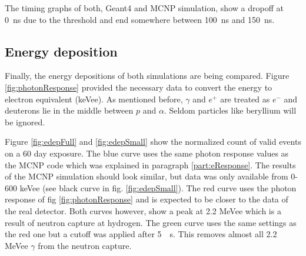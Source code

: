 \documentclass[12pt]{article}
\begin{document}
The timing graphs of both, Geant4 and MCNP simulation, show a dropoff at \SI{0}{ns} due to the threshold and end somewhere between \SI{100}{ns} and \SI{150}{ns}.  

\subsection{Energy deposition}

Finally, the energy depositions of both simulations are being compared. Figure \ref{fig:photonResponse} provided the necessary data to convert the energy to electron equivalent (keVee). As mentioned before, $\gamma$ and $e^+$ are treated as $e^-$ and deuterons lie in the middle between $p$ and $\alpha$. Seldom particles like beryllium will be ignored.

Figure \ref{fig:edepFull} and \ref{fig:edepSmall} show the normalized count of valid events on a 60 day exposure. The blue curve uses the same photon response values as the MCNP code which was explained in paragraph \ref{part:eResponse}. The results of the MCNP simulation should look similar, but data was only available from 0-600 keVee (see black curve in fig. \ref{fig:edepSmall}). 
The red curve uses the photon response of fig \ref{fig:photonResponse} and is expected to be closer to the  data of the real detector. Both curves however, show a peak at 2.2 MeVee which is a result of neutron capture at hydrogen.
The green curve uses the same settings as the red one but a cutoff was applied after \SI{5}{\SIUnitSymbolMicro s}. This removes almost all 2.2 MeVee $\gamma$ from the neutron capture.
\end{document}
